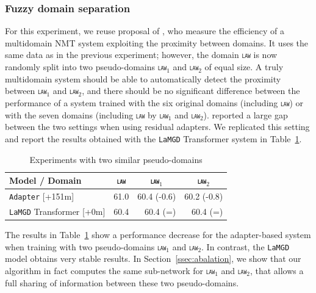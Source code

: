 \documentclass[11pt]{article}
\newcommand{\domain}[1]{\texttt{\textsc{#1}}}
\newcommand{\system}[1]{\texttt{{#1}}}
\begin{document}
\subsubsection{Fuzzy domain separation}
\label{ssec:fuzzy}
For this experiment, we reuse proposal of \citet{Pham21revisiting}, who measure the efficiency of a multidomain NMT system exploiting the proximity between domains. It uses the same data as in the previous experiment; however, the domain \domain{law} is now randomly split into two pseudo-domains \domain{law$_1$} and \domain{law$_2$} of equal size. A truly multidomain system should be able to automatically detect the proximity between \domain{law$_1$} and \domain{law$_2$}, and there should be no significant difference between the performance of a system trained with the six original domains (including \domain{law}) or with the seven domains (including \domain{law} by \domain{law$_1$} and \domain{law$_2$}). \citet{Pham21revisiting} reported a large gap between the two settings when using residual adapters. We replicated this setting and report the results obtained with the \system{LaMGD} Transformer system in Table~\ref{tab:fuzzy}. 

\begin{table}[h!]
  \centering
  \begin{tabular}{|p{4cm}|*{3}{r|}} \hline
    Model / Domain & \multicolumn{1}{c|}{\domain{law}} & \multicolumn{1}{c|}{\domain{law$_1$}} & \multicolumn{1}{c|}{\domain{law$_2$}} \\ \hline 
    \system{Adapter}   \hfill{\footnotesize[+151m]}  & 61.0 & 60.4 (-0.6) &  60.2 (-0.8) \\ 
    \system{LaMGD} Transformer   \hfill{\footnotesize[+0m]}  & 60.4 & 60.4 (=) & 60.4 (=) \\ 
    \hline
  \end{tabular}
  \caption{Experiments with two similar pseudo-domains}
  \label{tab:fuzzy}
\end{table}

The results in Table~\ref{tab:fuzzy} show a performance decrease for the adapter-based system when training with two pseudo-domains \domain{law$_1$} and \domain{law$_2$}. In contrast, the \system{LaMGD} model obtains very stable results. In Section~\ref{ssec:abalation}, we show that our algorithm in fact computes the same sub-network for \domain{law$_1$} and \domain{law$_2$}, that allows a full sharing of information between these two pseudo-domains.
\end{document}
